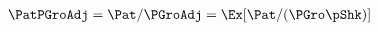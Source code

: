  \begin{equation}\begin{gathered}\begin{aligned}
    \PatPGroAdj  & = \Pat/\PGroAdj = \Ex[\Pat/(\PGro\pShk)]  \label{eq:GPFNrm}
  \end{aligned}\end{gathered}\end{equation}
